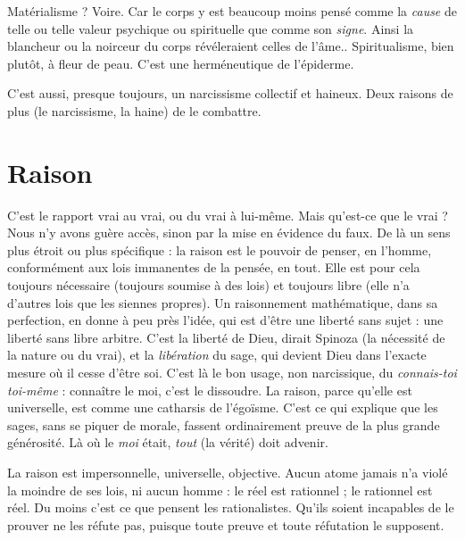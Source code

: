 Matérialisme ? Voire. Car le corps y est beaucoup moins pensé comme la
{\it cause} de telle ou telle valeur psychique ou spirituelle que comme son {\it signe}.
Ainsi la blancheur ou la noirceur du corps révéleraient celles de l’âme.. Spiritualisme,
bien plutôt, à fleur de peau. C’est une herméneutique de l’épiderme.

C’est aussi, presque toujours, un narcissisme collectif et haineux. Deux raisons
de plus (le narcissisme, la haine) de le combattre.

\section{Raison}
C'est le rapport vrai au vrai, ou du vrai à lui-même. Mais qu'est-ce
que le vrai ? Nous n’y avons guère accès, sinon par la mise en évidence
du faux. De là un sens plus étroit ou plus spécifique : la raison est le pouvoir
de penser, en l’homme, conformément aux lois immanentes de la pensée,
en tout. Elle est pour cela toujours nécessaire (toujours soumise à des lois) et
toujours libre (elle n’a d’autres lois que les siennes propres). Un raisonnement
mathématique, dans sa perfection, en donne à peu près l’idée, qui est d’être une
liberté sans sujet : une liberté sans libre arbitre. C’est la liberté de Dieu, dirait
Spinoza (la nécessité de la nature ou du vrai), et la {\it libération} du sage, qui
devient Dieu dans l’exacte mesure où il cesse d’être soi. C’est là le bon usage,
non narcissique, du {\it connais-toi toi-même} : connaître le moi, c’est le dissoudre.
La raison, parce qu’elle est universelle, est comme une catharsis de l’égoïsme.
C’est ce qui explique que les sages, sans se piquer de morale, fassent ordinairement
preuve de la plus grande générosité. Là où le {\it moi} était, {\it tout} (la vérité) doit
advenir.

La raison est impersonnelle, universelle, objective. Aucun atome jamais n’a
violé la moindre de ses lois, ni aucun homme : le réel est rationnel ; le rationnel
est réel. Du moins c’est ce que pensent les rationalistes. Qu'ils soient incapables
de le prouver ne les réfute pas, puisque toute preuve et toute réfutation le supposent.

